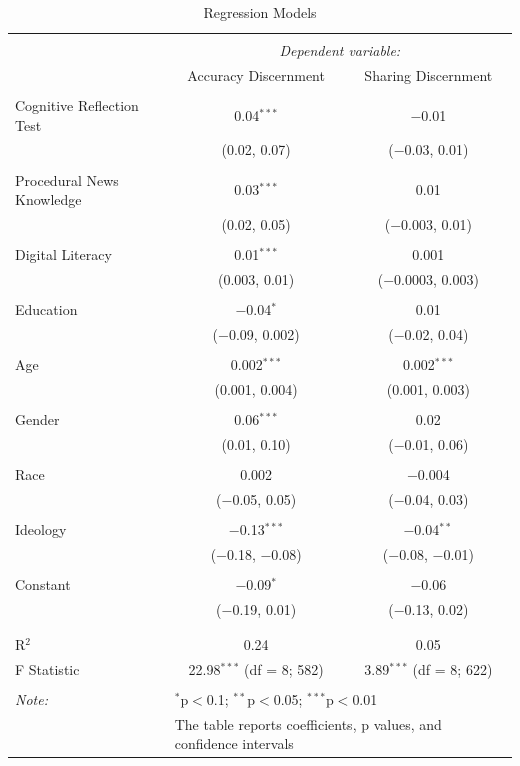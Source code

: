 \documentclass[
]{article}
\begin{document}
\begin{table}[!htbp] \centering 
  \caption{Regression Models} 
  \label{} 
\small 
\begin{tabular}{@{\extracolsep{1pt}}lcc} 
\\[-1.8ex]\hline 
\hline \\[-1.8ex] 
 & \multicolumn{2}{c}{\textit{Dependent variable:}} \\ 
\cline{2-3} 
 & Accuracy Discernment & Sharing Discernment \\ 
\hline \\[-1.8ex] 
 Cognitive Reflection Test & 0.04$^{***}$ & $-$0.01 \\ 
  & (0.02, 0.07) & ($-$0.03, 0.01) \\ 
  & & \\ 
 Procedural News Knowledge & 0.03$^{***}$ & 0.01 \\ 
  & (0.02, 0.05) & ($-$0.003, 0.01) \\ 
  & & \\ 
 Digital Literacy & 0.01$^{***}$ & 0.001 \\ 
  & (0.003, 0.01) & ($-$0.0003, 0.003) \\ 
  & & \\ 
 Education & $-$0.04$^{*}$ & 0.01 \\ 
  & ($-$0.09, 0.002) & ($-$0.02, 0.04) \\ 
  & & \\ 
 Age & 0.002$^{***}$ & 0.002$^{***}$ \\ 
  & (0.001, 0.004) & (0.001, 0.003) \\ 
  & & \\ 
 Gender & 0.06$^{***}$ & 0.02 \\ 
  & (0.01, 0.10) & ($-$0.01, 0.06) \\ 
  & & \\ 
 Race & 0.002 & $-$0.004 \\ 
  & ($-$0.05, 0.05) & ($-$0.04, 0.03) \\ 
  & & \\ 
 Ideology & $-$0.13$^{***}$ & $-$0.04$^{**}$ \\ 
  & ($-$0.18, $-$0.08) & ($-$0.08, $-$0.01) \\ 
  & & \\ 
 Constant & $-$0.09$^{*}$ & $-$0.06 \\ 
  & ($-$0.19, 0.01) & ($-$0.13, 0.02) \\ 
  & & \\ 
\hline \\[-1.8ex] 
R$^{2}$ & 0.24 & 0.05 \\ 
F Statistic & 22.98$^{***}$ (df = 8; 582) & 3.89$^{***}$ (df = 8; 622) \\ 
\hline 
\hline \\[-1.8ex] 
\textit{Note:}  & \multicolumn{2}{l}{$^{*}$p$<$0.1; $^{**}$p$<$0.05; $^{***}$p$<$0.01} \\ 
 & \multicolumn{2}{l}{The table reports coefficients, p values, and confidence intervals} \\ 
\end{tabular} 
\end{table}
\end{document}
